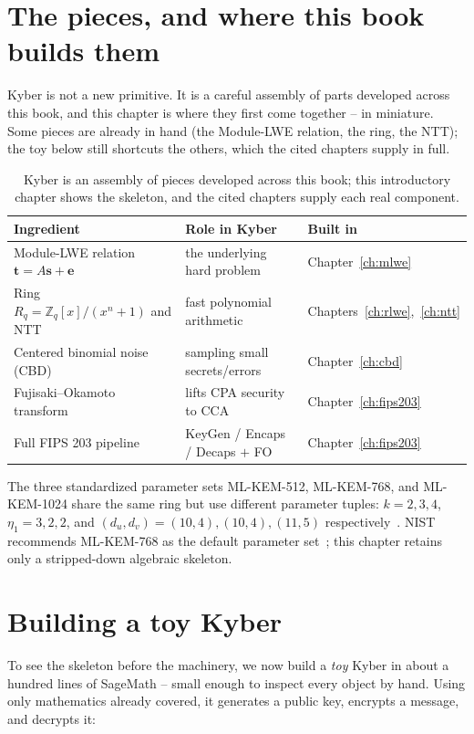 \section{The pieces, and where this book builds them}

Kyber is not a new primitive. It is a careful assembly of parts developed across this book, and this chapter is where they first come together -- in miniature. Some pieces are already in hand (the Module-LWE relation, the ring, the NTT); the toy below still shortcuts the others, which the cited chapters supply in full.

\begin{table}[H]
\centering
\small
\begin{tabular}{lll}
\toprule
Ingredient & Role in Kyber & Built in \\
\midrule
Module-LWE relation $\mathbf{t}=A\mathbf{s}+\mathbf{e}$ & the underlying hard problem & Chapter~\ref{ch:mlwe} \\
Ring $R_q=\mathbb{Z}_q[x]/(x^n+1)$ and NTT & fast polynomial arithmetic & Chapters~\ref{ch:rlwe},~\ref{ch:ntt} \\
Centered binomial noise (CBD) & sampling small secrets/errors & Chapter~\ref{ch:cbd} \\
Fujisaki--Okamoto transform & lifts CPA security to CCA & Chapter~\ref{ch:fips203} \\
Full FIPS 203 pipeline & KeyGen / Encaps / Decaps $+$ FO & Chapter~\ref{ch:fips203} \\
\bottomrule
\end{tabular}
\caption{Kyber is an assembly of pieces developed across this book; this introductory chapter shows the skeleton, and the cited chapters supply each real component.}
\label{tab:kyber-pieces}
\end{table}

The three standardized parameter sets ML-KEM-512, ML-KEM-768, and ML-KEM-1024 share the same ring but use different parameter tuples: $k=2,3,4$, $\eta_1=3,2,2$, and $(d_u,d_v)=(10,4),(10,4),(11,5)$ respectively~\cite{fips203}. NIST recommends ML-KEM-768 as the default parameter set~\cite{nistir8547}; this chapter retains only a stripped-down algebraic skeleton.

\section{Building a toy Kyber}

To see the skeleton before the machinery, we now build a \emph{toy} Kyber in about a hundred lines of SageMath -- small enough to inspect every object by hand. Using only mathematics already covered, it generates a public key, encrypts a message, and decrypts it:

